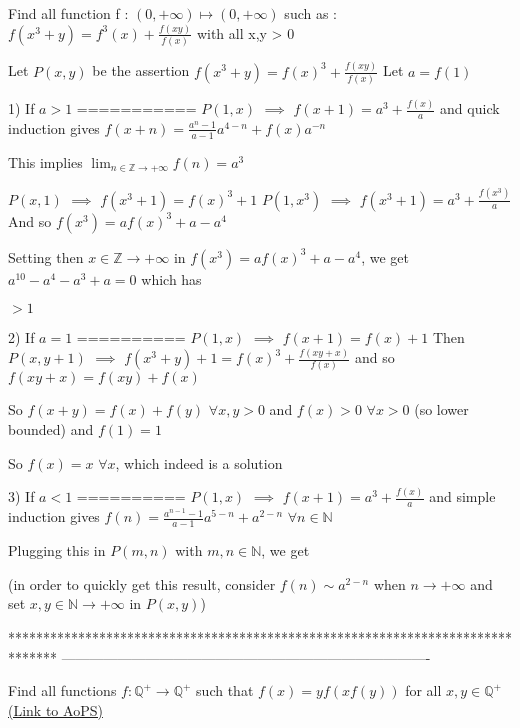 \begin{solution}
	\begin{tcolorbox}Find all function f : $(0,+\infty ) \mapsto (0,+\infty)$ such as :
$f(x^{3}+y)=f^{3}(x)+\frac{f(xy)}{f(x)}$ with all x,y > 0\end{tcolorbox}
Let $P(x,y)$ be the assertion $f(x^3+y)=f(x)^3+\frac{f(xy)}{f(x)}$
Let $a=f(1)$


1) If $a>1$
===========
$P(1,x)$ $\implies$ $f(x+1)=a^3+\frac{f(x)}a$ and quick induction gives $f(x+n)=\frac{a^{n}-1}{a-1}a^{4-n}+f(x)a^{-n}$

This implies $\lim_{n\in\mathbb Z\to+\infty}f(n)=a^3$

$P(x,1)$ $\implies$ $f(x^3+1)=f(x)^3+1$
$P(1,x^3)$ $\implies$ $f(x^3+1)=a^3+\frac{f(x^3)}a$
And so $f(x^3)=af(x)^3+a-a^4$

Setting then $x\in\mathbb Z\to+\infty$ in $f(x^3)=af(x)^3+a-a^4$, we get  $a^{10}-a^4-a^3+a=0$ which has  $>1$

2) If $a=1$
==========
$P(1,x)$ $\implies$ $f(x+1)=f(x)+1$
Then $P(x,y+1)$ $\implies$ $f(x^3+y)+1=f(x)^3+\frac{f(xy+x)}{f(x)}$ and so $f(xy+x)=f(xy)+f(x)$

So $f(x+y)=f(x)+f(y)$ $\forall x,y>0$ and $f(x)>0$ $\forall x>0$ (so lower bounded) and $f(1)=1$

So $\boxed{f(x)=x}$ $\forall x$, which indeed is a solution

3) If $a<1$
==========
$P(1,x)$ $\implies$ $f(x+1)=a^3+\frac{f(x)}a$ and simple induction gives $f(n)=\frac{a^{n-1}-1}{a-1}a^{5-n}+a^{2-n}$ $\forall n\in\mathbb N$

Plugging this in $P(m,n)$ with $m,n\in\mathbb N$, we get 
(in order to quickly get this result, consider $f(n)\sim a^{2-n}$ when $n\to +\infty$ and set $x,y\in\mathbb N\to+\infty$ in $P(x,y)$)
\end{solution}
*******************************************************************************
-------------------------------------------------------------------------------

\begin{problem}
	Find all functions $f:\mathbb{Q}^+\to\mathbb{Q}^+$ such that $f(x)=yf(xf(y))$ for all $x,y\in\mathbb{Q}^+$
	\flushright \href{https://artofproblemsolving.com/community/c6h557601}{(Link to AoPS)}
\end{problem}



